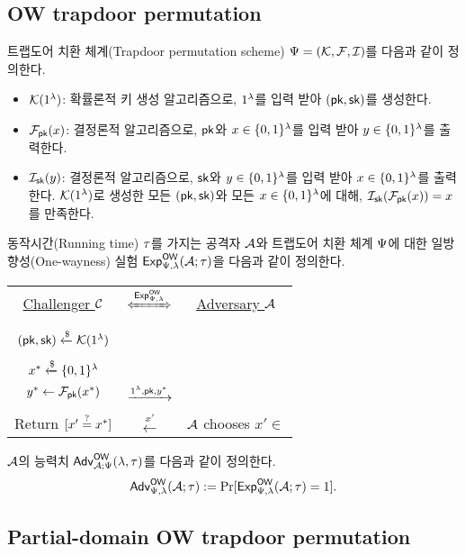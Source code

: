 \documentclass{article}
\theoremstyle{definition}
\begin{document}
\subsection{OW trapdoor permutation}
트랩도어 치환 체계(Trapdoor permutation scheme) $\tdsch = (\genkey, \td, \itd)$를 다음과
같이 정의한다.
\begin{itemize}
	\item $\genkey(1^{\sp})$: 확률론적 키 생성 알고리즘으로, $1^{\sp}$를 입력
	받아 $(\pk, \sk)$를 생성한다.
	\item $\td_{\pk}(x)$: 결정론적 알고리즘으로, $\pk$와 $x \in \set{0, 1}^{\sp}$를 입력 받아
	$y \in \set{0 ,1}^{\sp}$를 출력한다.
	\item $\itd_{\sk}(y)$: 결정론적 알고리즘으로, $\sk$와 $y \in \set{0,
	1}^{\sp}$를 입력 받아 $x \in \set{0, 1}^{\sp}$를 출력한다.
	$\genkey(1^{\sp})$로 생성한 모든 $(\pk, \sk)$와 모든 $x \in \set{0,
	1}^{\sp}$에 대해, $\itd_{\sk}(\td_{\pk}(x)) = x$를 만족한다.
\end{itemize}
동작시간(Running time) $\rt$를 가지는 공격자 $\adv$와 트랩도어 치환 체계
$\tdsch$에 대한 일방향성(One-wayness) 실험 $\Exp^{\ow}_{\tdsch, \sp}(\adv; \rt)$을
다음과 같이 정의한다.
\begin{tcolorbox}[colback=white]
	\centering
	\begin{tabularx}{\linewidth}{CcC}
		\underline{Challenger $\ch$} & $\xLeftrightarrow{\Exp^{\ow}_{\tdsch, \sp}}$ & \underline{Adversary $\adv$} \\
		\\
		$(\pk, \sk) \rgets \genkey(1^{\sp})$ & & \\
		\\
		$x^* \rgets \set{0, 1}^{\sp}$ \\ $y^* \gets \td_{\pk}(x^*)$ & $\xrightarrow{1^{\sp}, \pk, y^*}$ & \\
		\\ 
		Return $[x' \same x^*]$ & $\xleftarrow{x'}$ & $\adv$ chooses $x' \in \xspace$ \\
  \end{tabularx}
\end{tcolorbox}

$\adv$의 능력치 $\Adv^{\ow}_{\adv;
\tdsch}(\sp, \rt)$를 다음과 같이 정의한다.
$$
	\Adv^{\ow}_{\tdsch, \sp}(\adv; \rt) := \Pr[\Exp^{\ow}_{\tdsch, \sp}(\adv; \rt) = 1].
$$

\subsection{Partial-domain OW trapdoor permutation}
\end{document}
